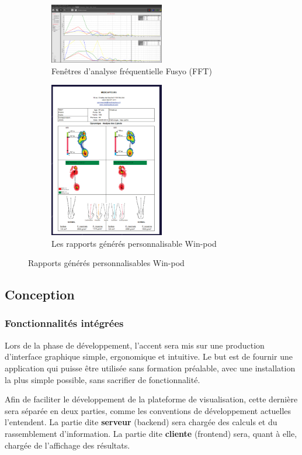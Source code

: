 \begin{figure}[H]
    \centering
    \begin{subfigure}[b]{0.45\textwidth}
      \centering
      \includegraphics[width=5cm]{images/analyse_marche/FFT.png}
      \caption{Fenêtres d’analyse fréquentielle Fusyo (FFT)}\label{fig:FFT}
    \end{subfigure}
    \begin{subfigure}[b]{0.45\textwidth}
      \centering
      \includegraphics[width=5cm]{images/analyse_marche/WinPod4.png}
    \caption{Les rapports générés personnalisable Win-pod}\label{fig:WinPod4}
    \end{subfigure}
    \caption{Rapports générés personnalisables Win-pod}\label{fig:global2}
\end{figure}

\subsection{Conception}

\subsubsection{Fonctionnalités intégrées}
Lors de la phase de développement, l'accent sera mis sur une production d'interface graphique simple, ergonomique et intuitive.
Le but est de fournir une application qui puisse être utilisée sans formation préalable, avec une installation la plus simple possible, sans sacrifier de fonctionnalité.

Afin de faciliter le développement de la plateforme de visualisation, cette dernière sera séparée en deux parties, comme les conventions de développement actuelles l'entendent. 
La partie dite \textbf{serveur} (backend) sera chargée des calculs et du rassemblement d'information. 
La partie dite \textbf{cliente} (frontend) sera, quant à elle, chargée de l'affichage des résultats.

